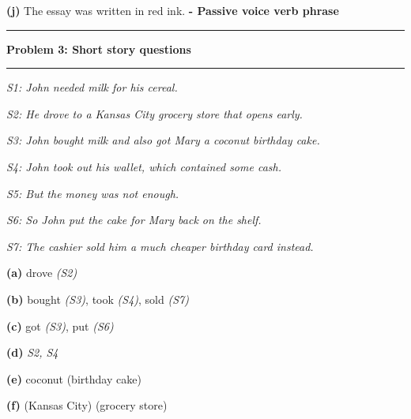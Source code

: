 \documentclass[11pt]{article}
\newcommand\question[2]{\vspace{.25in}\hrule\textbf{#1: #2}\vspace{.5em}\hrule\vspace{.10in}}
\renewcommand\part[1]{\vspace{.10in}\textbf{(#1)}}
\begin{document}
\part{j} The essay was written in red ink. \textbf{- Passive voice verb phrase}

\question{Problem 3}{Short story questions}

\qquad \emph{S1: John needed milk for his cereal.}

\qquad \emph{S2: He drove to a Kansas City grocery store that opens early.}

\qquad \emph{S3: John bought milk and also got Mary a coconut birthday cake.}

\qquad \emph{S4: John took out his wallet, which contained some cash.}

\qquad \emph{S5: But the money was not enough.}

\qquad \emph{S6: So John put the cake for Mary back on the shelf.}

\qquad \emph{S7: The cashier sold him a much cheaper birthday card instead.}

\part{a} drove \emph{(S2)}

\part{b} bought \emph{(S3)}, took \emph{(S4)}, sold \emph{(S7)}

\part{c} got \emph{(S3)}, put \emph{(S6)}

\part{d} \emph{S2, S4}

\part{e} coconut (birthday cake)

\part{f} (Kansas City) (grocery store)
\end{document}
